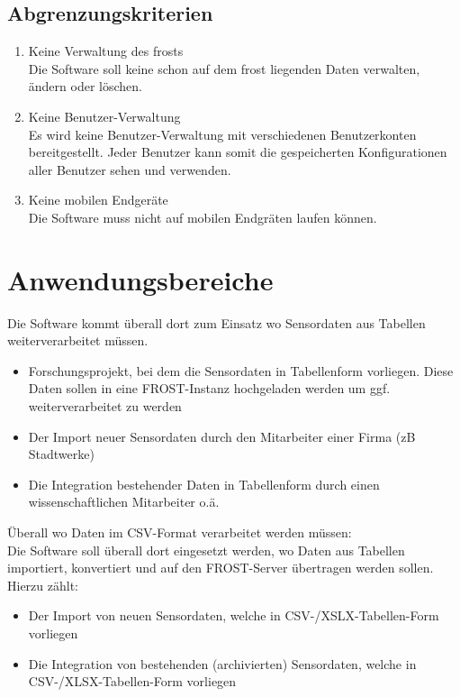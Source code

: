 \documentclass[a4paper, 12 pt]{article}
\begin{document}
	\subsection{Abgrenzungskriterien}
	\begin{enumerate}
	\item Keine Verwaltung des \gls{frost}s \\
	Die Software soll keine schon auf dem \gls{frost} liegenden Daten verwalten, ändern oder löschen.
	\item Keine Benutzer-Verwaltung \\
	Es wird keine Benutzer-Verwaltung mit verschiedenen Benutzerkonten bereitgestellt.
	Jeder Benutzer kann somit die gespeicherten Konfigurationen aller Benutzer sehen und verwenden.
	\item Keine mobilen Endgeräte \\
	Die Software muss nicht auf mobilen Endgräten laufen können.
	\end{enumerate}

\newpage
\section{Anwendungsbereiche}
Die Software kommt überall dort zum Einsatz wo Sensordaten aus Tabellen weiterverarbeitet müssen. \\
\begin{itemize}
	\item Forschungsprojekt, bei dem die Sensordaten in Tabellenform vorliegen. Diese Daten sollen in eine FROST-Instanz hochgeladen werden um ggf. weiterverarbeitet zu werden
	\item Der Import neuer Sensordaten durch den Mitarbeiter einer Firma (zB Stadtwerke)
	\item Die Integration bestehender Daten in Tabellenform durch einen wissenschaftlichen Mitarbeiter o.ä.
\end{itemize}



Überall wo Daten im CSV-Format verarbeitet werden müssen: \\
Die Software soll überall dort eingesetzt werden, wo Daten aus Tabellen importiert, konvertiert und auf den FROST-Server übertragen werden sollen. \\
Hierzu zählt:
\begin{itemize}
	\item Der Import von neuen Sensordaten, welche in CSV-/XSLX-Tabellen-Form vorliegen
	\item Die Integration von bestehenden (archivierten) Sensordaten, welche in CSV-/XLSX-Tabellen-Form vorliegen
\end{itemize}
\end{document}
